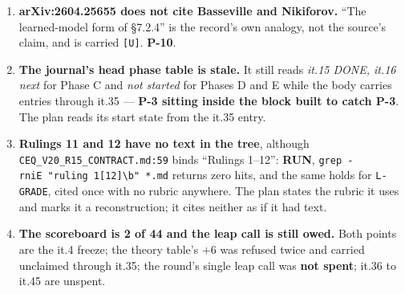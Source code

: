 \documentclass[11pt,a4paper]{article}
\theoremstyle{plain}
\theoremstyle{definition}
\theoremstyle{remark}
\begin{document}
\begin{enumerate}
  \textbf{no} \(\gamma\), per \texttt{Occupancy.lean:6-17}).
  \textbf{P-3} (\texttt{:316}).
\item
  \textbf{arXiv:2604.25655 does not cite Basseville and Nikiforov.}
  ``The learned-model form of §7.2.4'' is the record's own analogy, not
  the source's claim, and is carried \texttt{{[}U{]}}. \textbf{P-10}.
\item
  \textbf{The journal's head phase table is stale.} It still reads
  \emph{it.15 DONE, it.16 next} for Phase C and \emph{not started} for
  Phases D and E while the body carries entries through it.35 ---
  \textbf{P-3 sitting inside the block built to catch P-3}. The plan
  reads its start state from the it.35 entry.
\item
  \textbf{Rulings 11 and 12 have no text in the tree}, although
  \texttt{CEQ\_V20\_R15\_CONTRACT.md:59} binds ``Rulings 1--12'':
  \textbf{RUN},
  \texttt{grep\ -rniE\ "ruling\ 1{[}12{]}\textbackslash{}b"\ *.md}
  returns zero hits, and the same holds for \texttt{L-GRADE}, cited once
  with no rubric anywhere. The plan states the rubric it uses and marks
  it a reconstruction; it cites neither as if it had text.
\item
  \textbf{The scoreboard is 2 of 44 and the leap call is still owed.}
  Both points are the it.4 freeze; the theory table's \(+6\) was refused
  twice and carried unclaimed through it.35; the round's single leap
  call was \textbf{not spent}; it.36 to it.45 are unspent.
\end{enumerate}
\end{document}
